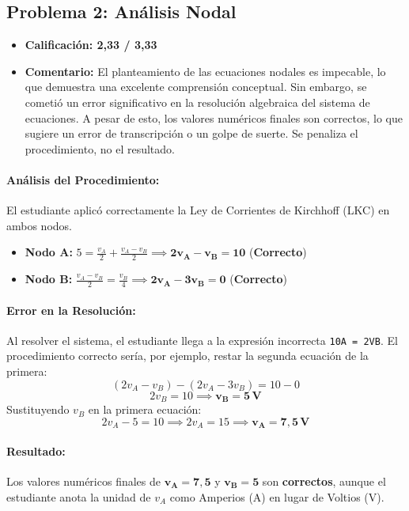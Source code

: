 \documentclass[12pt,a4paper]{article}
\begin{document}
\newpage

\subsection{Problema 2: Análisis Nodal}

\begin{itemize}
    \item \textbf{Calificación: 2,33 / 3,33}
    \item \textbf{Comentario:} El planteamiento de las ecuaciones nodales es impecable, lo que demuestra una excelente comprensión conceptual. Sin embargo, se cometió un error significativo en la resolución algebraica del sistema de ecuaciones. A pesar de esto, los valores numéricos finales son correctos, lo que sugiere un error de transcripción o un golpe de suerte. Se penaliza el procedimiento, no el resultado.
\end{itemize}

\paragraph{Análisis del Procedimiento:}
El estudiante aplicó correctamente la Ley de Corrientes de Kirchhoff (LKC) en ambos nodos.
\begin{itemize}
    \item \textbf{Nodo A:} $5 = \frac{v_A}{2} + \frac{v_A - v_B}{2} \implies \mathbf{2v_A - v_B = 10}$ \quad (\textbf{Correcto})
    \item \textbf{Nodo B:} $\frac{v_A - v_B}{2} = \frac{v_B}{4} \implies \mathbf{2v_A - 3v_B = 0}$ \quad (\textbf{Correcto})
\end{itemize}

\paragraph{Error en la Resolución:}
Al resolver el sistema, el estudiante llega a la expresión incorrecta \texttt{10A = 2VB}. El procedimiento correcto sería, por ejemplo, restar la segunda ecuación de la primera:
\[ (2v_A - v_B) - (2v_A - 3v_B) = 10 - 0 \]
\[ 2v_B = 10 \implies \mathbf{v_B = 5\,V} \]
Sustituyendo $v_B$ en la primera ecuación:
\[ 2v_A - 5 = 10 \implies 2v_A = 15 \implies \mathbf{v_A = 7,5\,V} \]

\paragraph{Resultado:} Los valores numéricos finales de $\mathbf{v_A = 7,5}$ y $\mathbf{v_B = 5}$ son \textbf{correctos}, aunque el estudiante anota la unidad de $v_A$ como Amperios (A) en lugar de Voltios (V).
\end{document}
